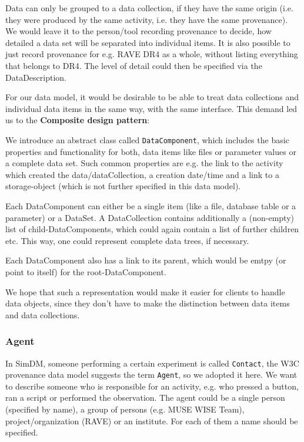 \documentclass[11pt,a4paper]{ivoa}
\begin{document}
Data can only be grouped to a data collection, if they have the same origin (i.e. they were
produced by the same activity, i.e. they have the same provenance).
We would leave it to the person/tool recording provenance to decide, how detailed a data set will be  
separated into individual items. It is also possible to just record provenance for e.g. RAVE DR4 as a 
whole, without listing everything that belongs to DR4. The level of detail could then be specified via 
the DataDescription.



For our data model, it would be desirable to be able to treat data collections and individual data items in
the same way, with the same interface. This demand led us to the 
\textbf{Composite design pattern}:


We introduce an abstract class called \texttt{DataComponent}, which 
includes the basic properties and functionality for both, data items like files or 
parameter values or a complete data set. Such common properties are e.g. the link 
to the activity which created the data/dataCollection, a creation date/time and a link to a
storage-object (which is not further specified in this data model).

Each DataComponent can either be a single item (like a file, database table or a parameter) 
or a DataSet. A DataCollection contains additionally a (non-empty) list of child-DataComponents, 
which could again contain a list of 
further children etc. This way, one could represent complete data trees, if necessary.

Each DataComponent also has a link to its parent, which would be 
emtpy (or point to itself) for the root-DataComponent.

We hope that such a representation would make it easier for clients to handle data 
objects, since they don't have to make the distinction between data items and data 
collections. 


\subsubsection{Agent}
In SimDM, someone performing a certain experiment is called \texttt{Contact}, 
the W3C provenance data model suggests the term \texttt{Agent}, so we adopted it here.
We want to describe someone who is responsible for an activity, e.g. who pressed a button, 
ran a script or performed the observation. The agent could be a single person 
(specified by name), a group of persons (e.g. MUSE WISE Team), project/organization (RAVE) or an institute. 
For each of them a name should be specified.
\end{document}
